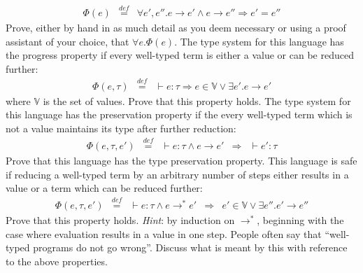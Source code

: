 \documentclass[10pt,a4paper]{exam}
\begin{document}
\begin{questions}
\begin{parts}
\begin{subparts}
\begin{displaymath}
\begin{array}{lcl}
\Phi(e) & \overset{\mathit{def}}{=} & \forall e',e''.  e  \longrightarrow  e'  \wedge  e  \longrightarrow  e''  \Rightarrow  e'  =  e'' 
\end{array}  
\end{displaymath}
Prove, either by hand in as much detail as you deem necessary or using a proof assistant of your choice, that $\forall e.\Phi(e)$. \droppoints 
\subpart[8] The type system for this language has the progress property if every well-typed term is either a value or can be reduced further:
\begin{displaymath}
\begin{array}{lcl}
\Phi(e, \tau) & \overset{\mathit{def}}{=} & \vdash e : \tau \Rightarrow e \in \mathbb{V} \vee \exists e'. e  \longrightarrow  e' 
\end{array}
\end{displaymath}
where $\mathbb{V}$ is the set of values. Prove that this property holds. \droppoints 
\subpart[8] The type system for this language has the preservation property if the every well-typed term which is not a value maintains its type after further reduction:
\begin{displaymath}
\begin{array}{lclcl}
\Phi(e,\tau,e') & \overset{\mathit{def}}{=} & \vdash e : \tau \wedge e \longrightarrow e' & \Rightarrow & \vdash e' : \tau 
\end{array}
\end{displaymath}
Prove that this language has the type preservation property. \droppoints 
\subpart[8] This language is safe if reducing a well-typed term by an arbitrary number of steps either results in a value or a term which can be reduced further:
\begin{displaymath}
\begin{array}{lclcl}
\Phi(e,\tau,e') & \overset{\mathit{def}}{=} & \vdash e : \tau \wedge e \longrightarrow^* e' & \Rightarrow & e' \in \mathbb{V} \vee \exists e''.e' \longrightarrow e''
\end{array} 
\end{displaymath}
Prove that this property holds. \emph{Hint}: by induction on $\longrightarrow^*$, beginning with the case where evaluation results in a value in one step. \droppoints 
\subpart[5] People often say that ``well-typed programs do not go wrong''. Discuss what is meant by this with reference to the above properties. \droppoints 
\end{subparts}
\end{parts} 


\end{questions}
\end{document}
